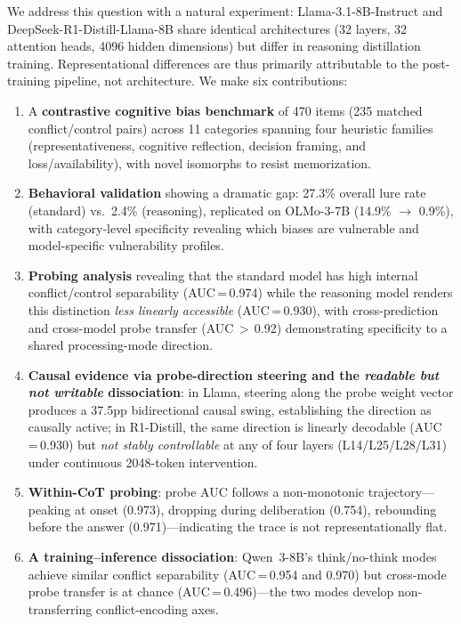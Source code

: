 \documentclass{article}
\begin{document}
We address this question with a natural experiment: Llama-3.1-8B-Instruct
and DeepSeek-R1-Distill-Llama-8B share identical architectures (32
layers, 32 attention heads, 4096 hidden dimensions) but differ in
reasoning distillation training.  Representational differences are
thus primarily attributable to the post-training pipeline, not
architecture.  We make six contributions:

\begin{enumerate}[leftmargin=*,itemsep=2pt]
  \item A \textbf{contrastive cognitive bias benchmark} of 470 items
  (235 matched conflict/control pairs) across 11 categories spanning
  four heuristic families (representativeness, cognitive reflection,
  decision framing, and loss/availability), with novel isomorphs to resist
  memorization.

  \item \textbf{Behavioral validation} showing a dramatic gap: 27.3\%
  overall lure rate (standard) vs.\ 2.4\% (reasoning), replicated on
  OLMo-3-7B (14.9\% $\to$ 0.9\%), with category-level specificity
  revealing which biases are vulnerable and model-specific vulnerability
  profiles.

  \item \textbf{Probing analysis} revealing that the standard model has
  high internal conflict/control separability (AUC\,=\,0.974) while the
  reasoning model renders this distinction \emph{less linearly accessible} (AUC\,=\,0.930),
  with cross-prediction and cross-model probe
  transfer (AUC\,$>$\,0.92) demonstrating specificity to a shared
  processing-mode direction.

  \item \textbf{Causal evidence via probe-direction steering and the \emph{readable but not writable} dissociation}: in Llama, steering along the probe weight vector produces a 37.5pp bidirectional causal swing, establishing the direction as causally active; in R1-Distill, the same direction is linearly decodable (AUC\,=\,0.930) but \emph{not stably controllable} at any of four layers (L14/L25/L28/L31) under continuous 2048-token intervention.

  \item \textbf{Within-CoT probing}: probe AUC follows a non-monotonic trajectory---peaking at onset (0.973), dropping during deliberation (0.754), rebounding before the answer (0.971)---indicating the trace is not representationally flat.

  \item \textbf{A training--inference dissociation}: Qwen~3-8B's think/no-think modes achieve similar conflict separability (AUC\,=\,0.954 and 0.970) but cross-mode probe transfer is at chance (AUC\,=\,0.496)---the two modes develop non-transferring conflict-encoding axes.
\end{enumerate}
\end{document}
